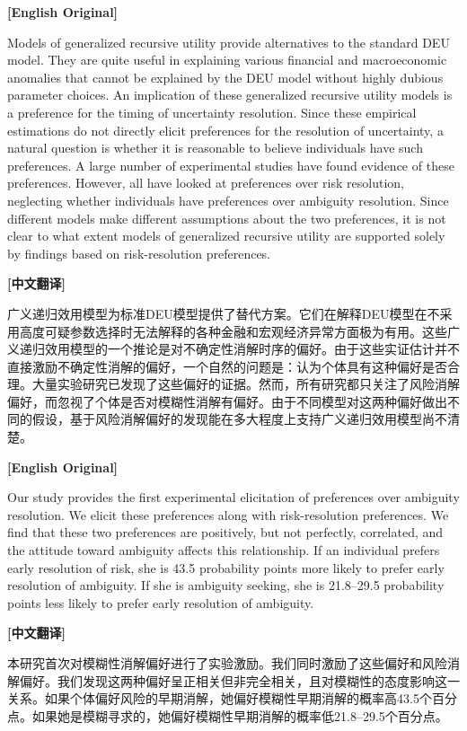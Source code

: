 \documentclass[12pt,a4paper]{ctexart}
\newenvironment{original}{%
  \par\medskip\noindent\textbf{[English Original]}\par\smallskip
  \color{black}\small
}{%
  \par\medskip
}
\newenvironment{translation}{%
  \par\noindent\textbf{[中文翻译]}\par\smallskip
  \color{blue}\small
}{%
  \par\bigskip
}
\theoremstyle{definition}
\theoremstyle{remark}
\begin{document}
\begin{original}
Models of generalized recursive utility provide alternatives to the standard DEU model. They are quite useful in explaining various financial and macroeconomic anomalies that cannot be explained by the DEU model without highly dubious parameter choices. An implication of these generalized recursive utility models is a preference for the timing of uncertainty resolution. Since these empirical estimations do not directly elicit preferences for the resolution of uncertainty, a natural question is whether it is reasonable to believe individuals have such preferences. A large number of experimental studies have found evidence of these preferences. However, all have looked at preferences over risk resolution, neglecting whether individuals have preferences over ambiguity resolution. Since different models make different assumptions about the two preferences, it is not clear to what extent models of generalized recursive utility are supported solely by findings based on risk-resolution preferences.
\end{original}
\begin{translation}
广义递归效用模型为标准DEU模型提供了替代方案。它们在解释DEU模型在不采用高度可疑参数选择时无法解释的各种金融和宏观经济异常方面极为有用。这些广义递归效用模型的一个推论是对不确定性消解时序的偏好。由于这些实证估计并不直接激励不确定性消解的偏好，一个自然的问题是：认为个体具有这种偏好是否合理。大量实验研究已发现了这些偏好的证据。然而，所有研究都只关注了风险消解偏好，而忽视了个体是否对模糊性消解有偏好。由于不同模型对这两种偏好做出不同的假设，基于风险消解偏好的发现能在多大程度上支持广义递归效用模型尚不清楚。
\end{translation}

\begin{original}
Our study provides the first experimental elicitation of preferences over ambiguity resolution. We elicit these preferences along with risk-resolution preferences. We find that these two preferences are positively, but not perfectly, correlated, and the attitude toward ambiguity affects this relationship. If an individual prefers early resolution of risk, she is 43.5 probability points more likely to prefer early resolution of ambiguity. If she is ambiguity seeking, she is 21.8--29.5 probability points less likely to prefer early resolution of ambiguity.
\end{original}
\begin{translation}
本研究首次对模糊性消解偏好进行了实验激励。我们同时激励了这些偏好和风险消解偏好。我们发现这两种偏好呈正相关但非完全相关，且对模糊性的态度影响这一关系。如果个体偏好风险的早期消解，她偏好模糊性早期消解的概率高43.5个百分点。如果她是模糊寻求的，她偏好模糊性早期消解的概率低21.8--29.5个百分点。
\end{translation}
\end{document}
